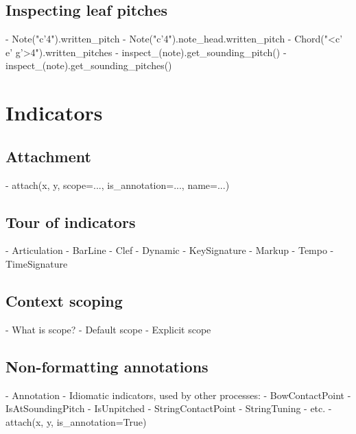 \subsection{Inspecting leaf pitches}

\begin{markdown}
-   Note("c'4").written_pitch
-   Note("c'4").note_head.written_pitch
-   Chord("<c' e' g'>4").written_pitches
-   inspect_(note).get_sounding_pitch()
-   inspect_(note).get_sounding_pitches()
\end{markdown}

\section{Indicators}

\subsection{Attachment}

\begin{markdown}
-   attach(x, y, scope=..., is_annotation=..., name=...)
\end{markdown}

\subsection{Tour of indicators}

\begin{markdown}
-   Articulation
-   BarLine
-   Clef
-   Dynamic
-   KeySignature
-   Markup
-   Tempo
-   TimeSignature
\end{markdown}

\subsection{Context scoping}

\begin{markdown}
-   What is scope?
-   Default scope
-   Explicit scope
\end{markdown}

\subsection{Non-formatting annotations}

\begin{markdown}
-   Annotation
-   Idiomatic indicators, used by other processes:
    -   BowContactPoint
    -   IsAtSoundingPitch
    -   IsUnpitched
    -   StringContactPoint
    -   StringTuning
    -   etc.
-   attach(x, y, is_annotation=True)
\end{markdown}

